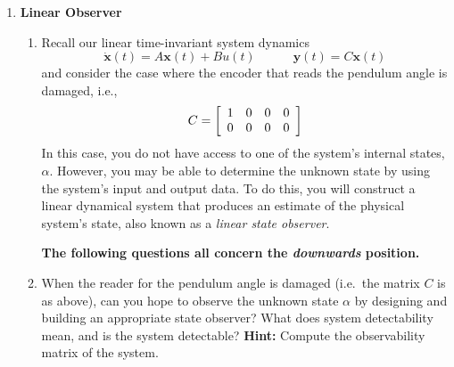 \begin{enumerate}
\begin{enumerate}
          \end{enumerate}
    \item \textbf{Linear Observer}\label{section:lab3_observer}
          \begin{enumerate}
              \item
                    Recall our linear time-invariant system dynamics
                    \[\mathbf{\dot{x}}(t)=A\mathbf{x}(t)+Bu(t) \quad \quad \quad \mathbf{y}(t)=C\mathbf{x}(t)\]
                    and consider the case where the encoder that reads the pendulum angle is damaged, i.e.,
                    \[C = \left[\begin{array}{c c c c}
                                1 & 0 & 0 & 0 \\
                                0 & 0 & 0 & 0
                            \end{array}\right]\]
                    In this case, you do not have access to one of the system's internal states, $\alpha$. However, you may be able to determine the unknown state by using the system's input and output data. To do this, you will construct a linear dynamical system that produces an estimate of the physical system's state, also known as a \emph{linear state observer}.

                    \textbf{The following questions all concern the \emph{downwards} position.}
              \item When the reader for the pendulum angle is damaged (i.e.\ the matrix \(C\) is as above), can you hope to observe the unknown state $\alpha$ by designing and building an appropriate state observer? What does system detectability mean, and is the system detectable? \textbf{Hint:} Compute the observability matrix of the system.


\end{enumerate}
\end{enumerate}
